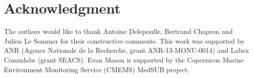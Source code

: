 \documentclass[journal]{IEEEtran}
\begin{document}
\section*{Acknowledgment}


The authors would like to thank Antoine Delepoulle, Bertrand Chapron and Julien Le Sommer for their constructive comments. This  work  was  supported  by  ANR (Agence Nationale de la Recherche, grant ANR-13-MONU-0014) and Labex Cominlabs (grant  SEACS). Evan Mason is supported by the Copernicus Marine Environment Monitoring Service (CMEMS) MedSUB project.


\ifCLASSOPTIONcaptionsoff
  \newpage
\fi







\end{document}
